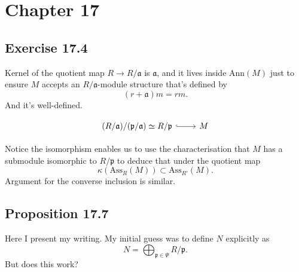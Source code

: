 \section{Chapter 17}

\subsection{Exercise 17.4}

Kernel of the quotient map $R\to R/\mathfrak a$ is $\mathfrak a$, and it lives inside $\text{Ann}(M)$ just to ensure $M$ accepts an $R/\mathfrak a$-module structure that's defined by 
\[(r+\mathfrak a)m=rm.\] And it's well-defined.

\[\begin{tikzcd}
	{(R/\mathfrak a)/(\mathfrak p/\mathfrak a)\simeq R/\mathfrak p} & M
	\arrow[hook, from=1-1, to=1-2]
\end{tikzcd}\]

Notice the isomorphism enables us to use the characterisation that $M$ has a submodule isomorphic to $R/\mathfrak p$ to deduce that under the quotient map \[\kappa(\text{Ass}_R(M))\subset \text{Ass}_{R'}(M).\]
Argument for the converse inclusion is similar.

\subsection{Proposition 17.7}

Here I present my writing. My initial guess was to define $N$ explicitly as
\[N=\bigoplus_{\mathfrak p\in \Psi}R/\mathfrak p.\]
But does this work? 

